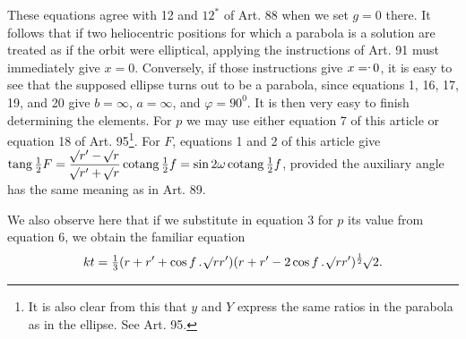 \noindent These equations agree with 12 and $12^*$ of Art. 88 when we set $g=0$ there. It follows that if two heliocentric positions for which a parabola is a solution are treated as if the orbit were elliptical, applying the instructions of Art. 91 must immediately give $x=0$. Conversely, if those instructions give $x=\mathpunct{\raisebox{.65ex}{.}}0$, it is easy to see that the supposed ellipse turns out to be a parabola, since equations 1, 16, 17, 19, and 20 give $b=\infty$, $a=\infty$, and $\varphi=90^0$. It is then very easy to finish determining the elements. For $p$ we may use either equation 7 of this article or equation 18 of Art. 95\footnote{It is also clear from this that $y$ and $Y$ express the same ratios in the parabola as in the ellipse. See Art. 95.}. For $F$, equations 1 and 2 of this article give $\operatorname{tang}\tfrac12 F=\dfrac{\mathord{{}^{}\!\surd}r'-\mathord{{}^{}\!\surd}r}{\mathord{{}^{}\!\surd}r'+\mathord{{}^{}\!\surd}r}\operatorname{cotang}\tfrac12 f=\sin2\omega\operatorname{cotang}\tfrac12 f$, provided the auxiliary angle has the same meaning as in Art. 89.

We also observe here that if we substitute in equation 3 for $p$ its value from equation 6, we obtain the familiar equation
\[
kt=\tfrac13(r+r'+\cos f\,\mathpunct{.}\mathord{{}^{}\!\surd}rr')(r+r'-2\cos f\,\mathpunct{.}\mathord{{}^{}\!\surd}rr')^{\frac12}\mathord{{}^{}\!\surd}2.
\]
